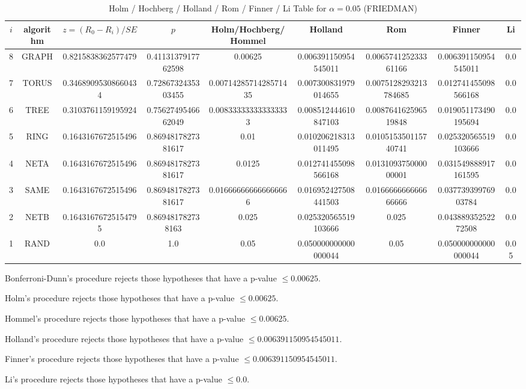 \documentclass[a4paper,10pt]{article}
\begin{document}
\begin{landscape}
\begin{table}[!htp]
\begin{tabular}{
|r|r|r|r|r|r|r|r|r|r|}
\end{tabular}
\end{table}

\newpage

\begin{table}[!htp]
\centering\scriptsize
\caption{Holm / Hochberg / Holland / Rom / Finner / Li Table for $\alpha=0.05$ (FRIEDMAN)}
\begin{tabular}{ccccccccc}
$i$&algorithm&$z=(R_0 - R_i)/SE$&$p$&Holm/Hochberg/Hommel&Holland&Rom&Finner&Li\\
\hline
8& GRAPH&0.8215838362577479&0.4113137917762598&0.00625&0.006391150954545011&0.006574125233361166&0.006391150954545011&0.0\\
7& TORUS&0.34689095308660434&0.7286732435303455&0.0071428571428571435&0.007300831979014655&0.0075128293213784685&0.012741455098566168&0.0\\
6& TREE&0.3103761159195924&0.7562749546662049&0.008333333333333333&0.008512444610847103&0.008764162596519848&0.019051173490195694&0.0\\
5& RING&0.1643167672515496&0.8694817827381617&0.01&0.010206218313011495&0.010515350115740741&0.025320565519103666&0.0\\
4& NETA&0.1643167672515496&0.8694817827381617&0.0125&0.012741455098566168&0.013109375000000001&0.031549888917161595&0.0\\
3& SAME&0.1643167672515496&0.8694817827381617&0.016666666666666666&0.016952427508441503&0.016666666666666666&0.03773939976903784&0.0\\
2& NETB&0.16431676725154795&0.869481782738163&0.025&0.025320565519103666&0.025&0.04388935252272508&0.0\\
1& RAND&0.0&1.0&0.05&0.050000000000000044&0.05&0.050000000000000044&0.05\\
\hline
\end{tabular}
\end{table}
Bonferroni-Dunn's procedure rejects those hypotheses that have a p-value $\le0.00625$.


Holm's procedure rejects those hypotheses that have a p-value $\le0.00625$.


Hommel's procedure rejects those hypotheses that have a p-value $\le0.00625$.


Holland's procedure rejects those hypotheses that have a p-value $\le0.006391150954545011$.


Finner's procedure rejects those hypotheses that have a p-value $\le0.006391150954545011$.


Li's procedure rejects those hypotheses that have a p-value $\le0.0$.




\end{landscape}
\end{document}
